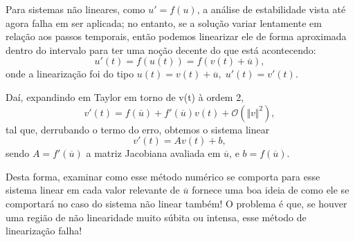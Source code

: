 \documentclass[../differential_methods.tex]{subfiles}
\begin{document}
Para sistemas não lineares, como \(u' = f(u)\), a análise de estabilidade vista até agora falha em ser aplicada; no entanto, se a solução variar lentamente em relação aos passos temporais, então podemos linearizar ele de forma aproximada dentro do intervalo para ter uma noção decente do que está acontecendo:
\[
	u'(t) = f(u(t)) = f(v(t) + \overline{u}),
\]
onde a linearização foi do tipo \(u(t) = v(t) + \overline{u},\; u'(t) = v'(t)\).

Daí, expandindo em Taylor em torno de v(t) à ordem 2,
\[
	v'(t) = f(\overline{u}) + f'(\overline{u})v(t) + \mathcal{O}(\Vert v \Vert^{2}),
\]
tal que, derrubando o termo do erro, obtemos o sistema linear
\[
	v'(t) = A v(t) + b,
\]
sendo \(A = f'(\overline{u})\) a matriz Jacobiana avaliada em \(\overline{u}\), e \( b = f(\overline{u})\).

Desta forma, examinar como esse método numérico se comporta para esse sistema linear em cada valor relevante de \(\overline{u}\) fornece uma boa ideia de como ele se comportará no caso do sistema não linear também!
O problema é que, se houver uma região de não linearidade muito súbita ou intensa, esse método de linearização falha!
\end{document}

